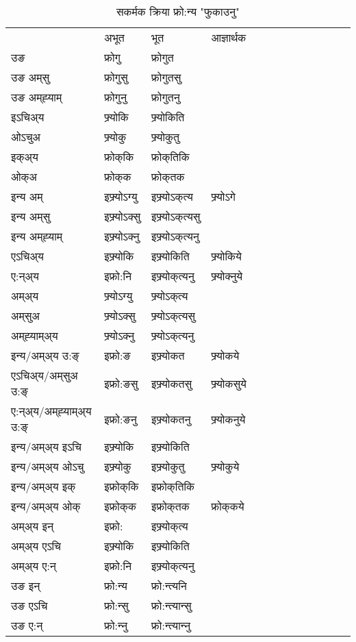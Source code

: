 \begin{table}[H]
\centering
\caption{\label{ok.vt} सकर्मक क्रिया  फ्रो:न्य  "फुकाउनु"  }
\begin{tabular}{l|l|l|l|l|l|l|l|l|l|l|l|l}  \toprule
&अभूत & भूत & आज्ञार्थक \\ 
उङ &फ्रोगु &फ्रोगुत \\ 
उङ अम्‌सु &फ्रोगुसु &फ्रोगुतसु \\ 
उङ अम्‌ह्‍याम् &फ्रोगुनु &फ्रोगुतनु \\ 
इऽचिअ्य &फ्र्योकि &फ्र्योकिति   \\ 
ओऽचुअ &फ्र्योकु &फ्र्योकुतु   \\ 
इक्अ्य &फ्रोक्‌कि &फ्रोक्‌तिकि   \\ 
ओक्अ &फ्रोक्‌क &फ्रोक्‌तक   \\ 
इन्य अम् & इफ्र्योऽग्यु  & इफ्र्योऽक्‌त्य &फ्र्योऽगे  \\ 
इन्य अम्‌सु & इफ्र्योऽक्सु  & इफ्र्योऽक्‌त्यसु   \\ 
इन्य अम्‌ह्‍याम् & इफ्र्योऽक्‍नु  & इफ्र्योऽक्‌त्यनु   \\ 
एऽचिअ्य & इफ्र्योकि & इफ्र्योकिति &फ्र्योकिये    \\ 
ए:न्अ्य & इफ्रो:नि  & इफ्र्योक्‌त्यनु &फ्र्योक्‍नुये  \\ 
अम्अ्य & फ्र्योऽग्यु  & फ्र्योऽक्‌त्य  \\ 
अम्‌सुअ & फ्र्योऽक्सु & फ्र्योऽक्‌त्यसु  \\ 
अम्‌ह्‍याम्अ्य & फ्र्योऽक्‍नु  & फ्र्योऽक्‌त्यनु \\ 
\midrule
इन्य/अम्अ्य उ:ङ्‌&इफ्रो:ङ & इफ्र्योकत &फ्र्योकये \\ 
एऽचिअ्य/अम्‌सुअ उ:ङ्‌ &इफ्रो:ङसु & इफ्र्योकतसु &फ्र्योकसुये \\ 
ए:न्अ्य/अम्‌ह्‍याम्अ्य उ:ङ्‌ &इफ्रो:ङनु & इफ्र्योकतनु &फ्र्योकनुये \\ 
इन्य/अम्अ्य इऽचि & इफ्र्योकि & इफ्र्योकिति    \\ 
इन्य/अम्अ्य ओऽचु & इफ्र्योकु & इफ्र्योकुतु  &फ्र्योकुये  \\ 
इन्य/अम्अ्य इक् & इफ्रोक्‌कि & इफ्रोक्‌तिकि   \\ 
इन्य/अम्अ्य ओक् & इफ्रोक्‌क & इफ्रोक्‌तक  &फ्रोक्‌कये  \\ 
अम्अ्य इन् & इफ्रो: & इफ्र्योक्‌त्य   \\ 
अम्अ्य एऽचि & इफ्र्योकि & इफ्र्योकिति    \\ 
अम्अ्य ए:न् & इफ्रो:नि  & इफ्र्योक्‌त्यनु  \\ 
\midrule
उङ इन् & फ्रो:न्य  & फ्रो:न्त्यनि  \\ 
उङ एऽचि & फ्रो:न्सु  & फ्रो:न्त्यान्सु   \\ 
उङ ए:न्& फ्रो:न्‍नु  & फ्रो:न्त्यान्‍नु   \\ 
\bottomrule
\end{tabular}
\end{table}



